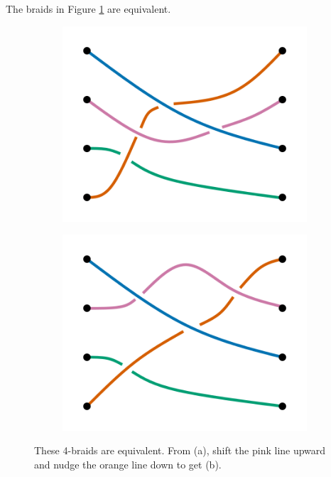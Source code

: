 \documentclass{amsart}
\begin{document}
\begin{example}
	The braids in Figure \ref{equivalent4braids} are equivalent.
	\begin{figure}[h]
		\begin{subfigure}{.5\textwidth}
			\centering
			\includegraphics[width=.9\linewidth]{Inkscape Files/4braid1.png}
			\caption{}
		\end{subfigure}%
		\begin{subfigure}{.5\textwidth}
			\centering
			\includegraphics[width=.9\linewidth]{Inkscape Files/4braid2.png}
			\caption{}
		\end{subfigure}
		\caption{These 4-braids are equivalent. From (a), shift the pink line upward
		and nudge the orange line down to get (b).}
		\label{equivalent4braids}
	\end{figure}
\end{example}
\end{document}
